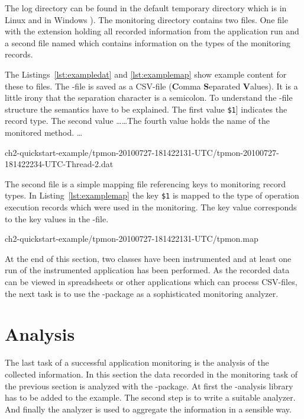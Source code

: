 \noindent The log directory can be found in the default temporary directory which is in Linux  and in Windows ). The monitoring directory contains two files. One file with the extension  holding all recorded information from the application run and a second file named  which contains information on the types of the monitoring records. 

The Listings~\ref{lst:exampledat} and \ref{lst:examplemap} show example content for these to files. The -file is saved as a CSV-file (\textbf{C}omma \textbf{S}eparated \textbf{V}alues). It is a little irony that the separation character is a semicolon. To understand the -file structure the semantics have to be explained. The first value \verb!$1!] indicates the record type. The second value \ldots \ldots The fourth value holds the name of the monitored method. \ldots

\setBashListing
%
{ch2-quickstart-example/tpmon-20100727-181422131-UTC/tpmon-20100727-181422234-UTC-Thread-2.dat}

\noindent The second file is a simple mapping file referencing keys to monitoring record types. In Listing~\ref{lst:examplemap} the key \verb!$1! is mapped to the type of operation execution records which were used in the monitoring. The key value corresponds to the key values in the -file.

%
{ch2-quickstart-example/tpmon-20100727-181422131-UTC/tpmon.map}

\noindent At the end of this section, two classes have been instrumented and at least one run of the instrumented application has been performed. As the recorded data can be viewed in spreadsheets or other applications which can process CSV-files, the next task is to use the \KiekerAnalysisPart{}-package as a sophisticated monitoring analyzer. 

\section{Analysis}\label{sec:example:analysis}

The last task of a successful application monitoring is the analysis of the collected information. In this section the data recorded in the monitoring task of the previous section is analyzed with the \KiekerAnalysisPart{}-package. At first the \Kieker{}-analysis library has to be added to the example. The second step is to write a suitable analyzer. And finally the analyzer is used to aggregate the information in a sensible way.

